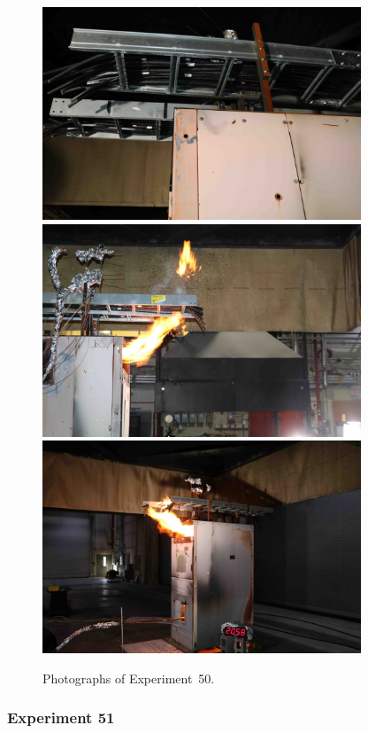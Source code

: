 \begin{figure}[p]
\centering
\includegraphics[height=2.50in]{../FIGURES/Test_50_cables} \\
\includegraphics[height=2.50in]{../FIGURES/Test_50_side} \\
\includegraphics[height=2.50in]{../FIGURES/Test_50_20_min_58_s}
\caption[Photographs of Experiment~50]{Photographs of Experiment~50.}
\label{fig:Test_50_photos}
\end{figure}


\clearpage

\subsubsection{Experiment 51}


